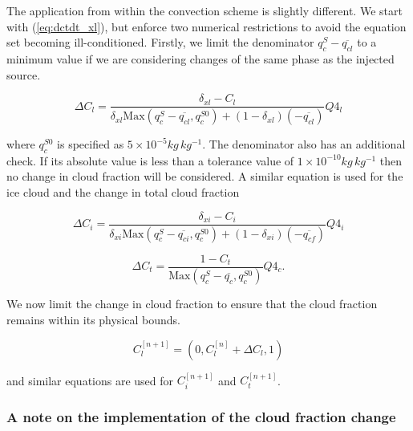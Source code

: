 \documentclass{UMDP_article}
\begin{document}
The application from within the convection scheme is slightly different.
We start with (\ref{eq:dctdt_xl}), but enforce two numerical restrictions
to avoid the equation set becoming ill-conditioned. Firstly, we limit
the denominator $q_c^S - \overline{q_{cl}}$ to a minimum value if we
are considering changes of the same phase as the injected source.

\begin{equation}
\Delta C_l = \frac  {\delta_{xl} - C_l}  {\delta_{xl} \text{Max}( q_{c}^S
- \overline{q_{cl}} , q_c^{S0} ) + ( 1 - \delta_{xl} ) (-\overline{q_{cl}}) }
Q4_l
\label{eq:delta_cl}
\end{equation}

where $q_c^{S0}$ is specified as $5 \times 10^{-5} kg \, kg^{-1}$.
The denominator also has an additional check. If its absolute
value is less than a tolerance value of $1 \times 10^{-10} kg \, kg^{-1}$
then no change in cloud fraction will be considered. A similar
equation is used for the ice cloud and the change in total cloud fraction


\begin{equation}
\Delta C_i = \frac  {\delta_{xi} - C_i}  {\delta_{xi} \text{Max}( q_{c}^S
- \overline{q_{ci}} , q_c^{S0} ) + ( 1 - \delta_{xi} ) (-\overline{q_{cf}}) }
Q4_i
\label{eq:delta_ci}
\end{equation}

\begin{equation}
\Delta C_t = \frac  {1 - C_t}
{ \text{Max}(q_c^S - \overline{q_c} , q_c^{S0} ) } Q4_c .
\label{eq:delta_ct}
\end{equation}

We now limit the change in cloud fraction to ensure that the cloud
fraction remains within its physical bounds.

\begin{equation}
C_l^{[n+1]} = ( 0,  C_l^{[n]} + \Delta C_l, 1)
\label{eq:delta_cl_conv_final}
\end{equation}

and similar equations are used for $C_i^{[n+1]}$ and $C_t^{[n+1]}$.

\subsubsection{A note on the implementation of the cloud fraction change}
\label{sec:conv_imp_note}
\end{document}
